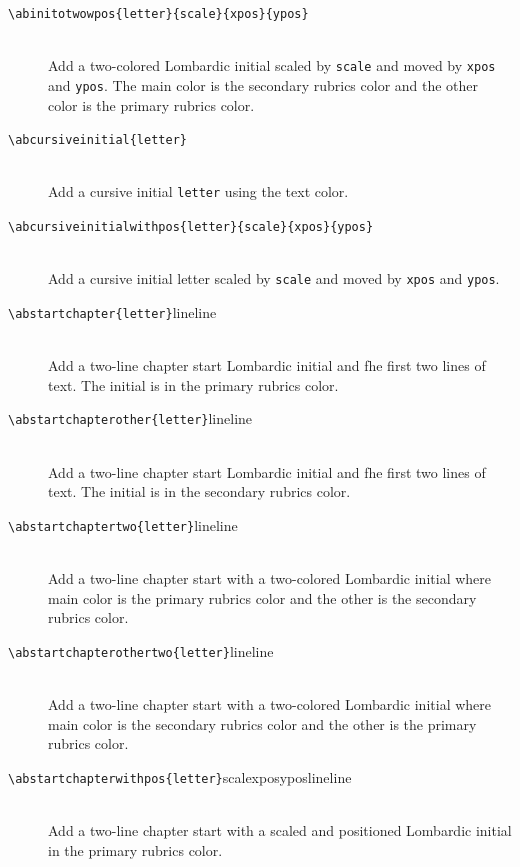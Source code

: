 \documentclass[a4paper]{article}
\newcommand{\feature}[1]{\texttt{#1}}
\newcommand{\ltxcmd}[2]{\texttt{\textbackslash{}#1\{#2\}}}
\newcommand{\ltxcmdfour}[5]{\texttt{\textbackslash{}#1\{#2\}\{#3\}\{#4\}\{#5\}}}
\begin{document}
\begin{description}
\item [\ltxcmdfour{abinitotwowpos}{letter}{scale}{xpos}{ypos}] \mbox{}  \\
  Add a two-colored Lombardic initial scaled by \feature{scale} and
  moved by \feature{xpos} and \feature{ypos}. The main color is the
  secondary rubrics color and the other color is the primary rubrics
  color.

\item [\ltxcmd{abcursiveinitial}{letter}] \mbox{} \\
  Add a cursive initial \feature{letter} using the text color. 

\item [\ltxcmdfour{abcursiveinitialwithpos}{letter}{scale}{xpos}{ypos}] \mbox{} \\
  Add a cursive initial letter scaled by \feature{scale} and moved by
  \feature{xpos} and \feature{ypos}. 


\item [\ltxcmd{abstartchapter}{letter}{line}{line}] \mbox{} \\
  Add a two-line chapter start Lombardic initial and fhe first two
  lines of text. The initial is in the primary rubrics color.

\item [\ltxcmd{abstartchapterother}{letter}{line}{line}] \mbox{} \\
  Add a two-line chapter start Lombardic initial and fhe first two
  lines of text. The initial is in the secondary rubrics color.

\item [\ltxcmd{abstartchaptertwo}{letter}{line}{line}] \mbox{} \\
  Add a two-line chapter start with a two-colored Lombardic initial
  where main color is the primary rubrics color and the other is the
  secondary rubrics color. 


\item [\ltxcmd{abstartchapterothertwo}{letter}{line}{line}] \mbox{} \\
  Add a two-line chapter start with a two-colored Lombardic initial
  where main color is the secondary rubrics color and the other is the
  primary rubrics color. 

\item [\ltxcmd{abstartchapterwithpos}{letter}{scale}{xpos}{ypos}{line}{line}] \mbox{} \\
  Add a two-line chapter start with a scaled and positioned Lombardic
  initial in the primary rubrics color. 


\end{description}
\end{document}
